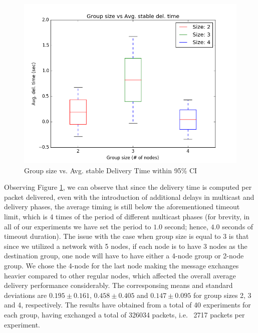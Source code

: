 \documentclass[a4paper, 12pt]{article}
\begin{document}
\begin{figure}[h]
\centering
   \includegraphics[scale=0.45]{GS_vs_AvgDT_Final.png}
   \caption{Group size vs. Avg. stable Delivery Time within 95\% CI}
   \label{gsvsavg}
\end{figure}

Observing Figure \ref{gsvsavg}, we can observe that since the delivery time is computed per packet delivered, even with the introduction of additional delays in multicast and delivery phases, the average timing is still below the aforementioned timeout limit, which is 4 times of the period of different multicast phases (for brevity, in all of our experiments we have set the period to $1.0$ second; hence, $4.0$ seconds of timeout duration). The issue with the case when group size is equal to 3 is that since we utilized a network with 5 nodes, if each node is to have 3 nodes as the destination group, one node will have to have either a 4-node group or 2-node group. We chose the 4-node for the last node making the message exchanges heavier compared to other regular nodes, which affected the overall average delivery performance considerably. The corresponsing means and standard deviations are $0.195 \pm 0.161$, $0.458 \pm 0.405$ and $0.147 \pm 0.095$ for group sizes 2, 3 and 4, respectively. The results have obtained from a total of 40 experiments for each group, having exchanged a total of 326034 packets, i.e. ~2717 packets per experiment.
\end{document}
